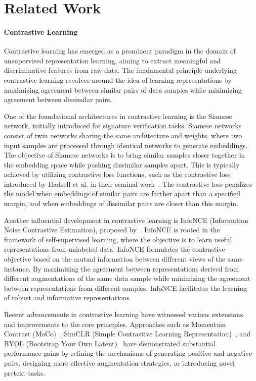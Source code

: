 \section{Related Work}\label{sec:rel_work}


\paragraph{Contrastive Learning} 
Contrastive learning has emerged as a prominent paradigm in the domain of unsupervised representation learning, aiming to extract meaningful and discriminative features from raw data. The fundamental principle underlying contrastive learning revolves around the idea of learning representations by maximizing agreement between similar pairs of data samples while minimizing agreement between dissimilar pairs.


One of the foundational architectures in contrastive learning is the Siamese network, initially introduced for signature verification tasks. Siamese networks consist of twin networks sharing the same architecture and weights, where two input samples are processed through identical networks to generate embeddings. The objective of Siamese networks is to bring similar samples closer together in the embedding space while pushing dissimilar samples apart. This is typically achieved by utilizing contrastive loss functions, such as the contrastive loss introduced by Hadsell et al. in their seminal work~\cite{bertinetto2016fully}. The contrastive loss penalizes the model when embeddings of similar pairs are farther apart than a specified margin, and when embeddings of dissimilar pairs are closer than this margin.


Another influential development in contrastive learning is InfoNCE (Information Noise Contrastive Estimation), proposed by~\cite{oord2018representation}. InfoNCE is rooted in the framework of self-supervised learning, where the objective is to learn useful representations from unlabeled data. InfoNCE formulates the contrastive objective based on the mutual information between different views of the same instance. By maximizing the agreement between representations derived from different augmentations of the same data sample while minimizing the agreement between representations from different samples, InfoNCE facilitates the learning of robust and informative representations.


Recent advancements in contrastive learning have witnessed various extensions and improvements to the core principles. Approaches such as Momentum Contrast (MoCo)~\cite{he2020momentum}, SimCLR (Simple Contrastive Learning Representation)~\cite{chen2020simple}, and BYOL (Bootstrap Your Own Latent)~\cite{grill2020bootstrap} have demonstrated substantial performance gains by refining the mechanisms of generating positive and negative pairs, designing more effective augmentation strategies, or introducing novel pretext tasks.



